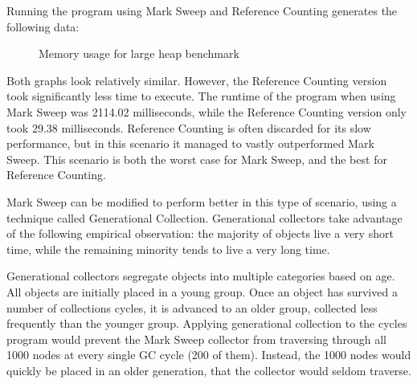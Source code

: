 \documentclass[10pt]{extarticle}
\begin{document}
\medskip
Running the program using Mark Sweep and Reference Counting generates the following data:

\begin{figure}[h]%
    \centering
    \qquad
    \caption{Memory usage for large heap benchmark}
\end{figure}

Both graphs look relatively similar. However, the Reference Counting version took significantly less time to execute. The runtime of the program when using Mark Sweep was 2114.02 milliseconds, while the Reference Counting version only took 29.38 milliseconds. Reference Counting is often discarded for its slow performance, but in this scenario it managed to vastly outperformed Mark Sweep. This scenario is both the worst case for Mark Sweep, and the best for Reference Counting.

\medskip
Mark Sweep can be modified to perform better in this type of scenario, using a technique called Generational Collection. Generational collectors take advantage of the following empirical observation: the majority of objects live a very short time, while the remaining minority tends to live a very long time. 

Generational collectors segregate objects into multiple categories based on age. All objects are initially placed in a young group. Once an object has survived a number of collections cycles, it is advanced to an older group, collected less frequently than the younger group. Applying generational collection to the cycles program would prevent the Mark Sweep collector from traversing through all 1000 nodes at every single GC cycle (200 of them). Instead, the 1000 nodes would quickly be placed in an older generation, that the collector would seldom traverse. 
\end{document}

